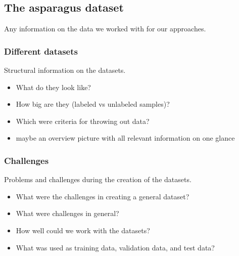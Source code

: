 \subsection{The asparagus dataset}

Any information on the data we worked with for our approaches.


\subsubsection{Different datasets}

Structural information on the datasets.

\begin{itemize}
\item What do they look like?
\item How big are they (labeled vs unlabeled samples)?
\item Which were criteria for throwing out data?
\item maybe an overview picture with all relevant information on one glance
\end{itemize}


\subsubsection{Challenges}

Problems and challenges during the creation of the datasets.

\begin{itemize}
\item What were the challenges in creating a general dataset?
\item What were challenges in general?
\item How well could we work with the datasets?
\item What was used as training data, validation data, and test data?
\end{itemize}
